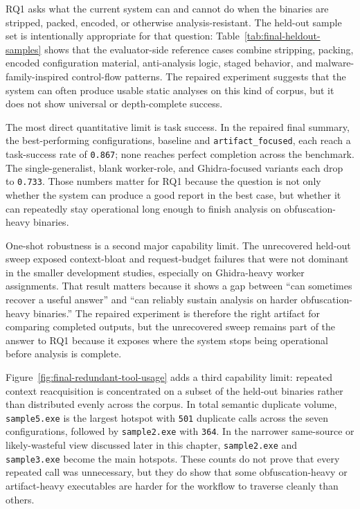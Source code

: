 RQ1 asks what the current system can and cannot do when the binaries are stripped, packed, encoded, or otherwise analysis-resistant. The held-out sample set is intentionally appropriate for that question: Table~\ref{tab:final-heldout-samples} shows that the evaluator-side reference cases combine stripping, packing, encoded configuration material, anti-analysis logic, staged behavior, and malware-family-inspired control-flow patterns. The repaired experiment suggests that the system can often produce usable static analyses on this kind of corpus, but it does not show universal or depth-complete success.

The most direct quantitative limit is task success. In the repaired final summary, the best-performing configurations, baseline and \texttt{artifact\_focused}, each reach a task-success rate of \texttt{0.867}; none reaches perfect completion across the benchmark. The single-generalist, blank worker-role, and Ghidra-focused variants each drop to \texttt{0.733}. Those numbers matter for RQ1 because the question is not only whether the system can produce a good report in the best case, but whether it can repeatedly stay operational long enough to finish analysis on obfuscation-heavy binaries.

One-shot robustness is a second major capability limit. The unrecovered held-out sweep exposed context-bloat and request-budget failures that were not dominant in the smaller development studies, especially on Ghidra-heavy worker assignments. That result matters because it shows a gap between ``can sometimes recover a useful answer'' and ``can reliably sustain analysis on harder obfuscation-heavy binaries.'' The repaired experiment is therefore the right artifact for comparing completed outputs, but the unrecovered sweep remains part of the answer to RQ1 because it exposes where the system stops being operational before analysis is complete.

Figure~\ref{fig:final-redundant-tool-usage} adds a third capability limit: repeated context reacquisition is concentrated on a subset of the held-out binaries rather than distributed evenly across the corpus. In total semantic duplicate volume, \texttt{sample5.exe} is the largest hotspot with \texttt{501} duplicate calls across the seven configurations, followed by \texttt{sample2.exe} with \texttt{364}. In the narrower same-source or likely-wasteful view discussed later in this chapter, \texttt{sample2.exe} and \texttt{sample3.exe} become the main hotspots. These counts do not prove that every repeated call was unnecessary, but they do show that some obfuscation-heavy or artifact-heavy executables are harder for the workflow to traverse cleanly than others.


